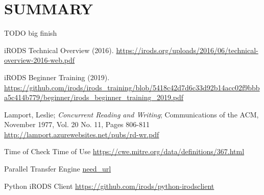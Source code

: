 \documentclass{irodsugm}
\begin{document}
\section*{SUMMARY}

TODO big finish

\begin{thebibliography}{5}

iRODS Technical Overview (2016). \url{https://irods.org/uploads/2016/06/technical-overview-2016-web.pdf}

iRODS Beginner Training (2019). \url{https://github.com/irods/irods_training/blob/5418c42d7d6c33d92b14acc02f9bbba5c414b779/beginner/irods_beginner_training_2019.pdf}

Lamport, Leslie; \textit{Concurrent Reading and Writing}; Communications of the ACM, November 1977, Vol. 20 No. 11, Pages 806-811 \url{http://lamport.azurewebsites.net/pubs/rd-wr.pdf}

Time of Check Time of Use \url{https://cwe.mitre.org/data/definitions/367.html}

Parallel Transfer Engine \url{need_url}

Python iRODS Client \url{https://github.com/irods/python-irodsclient}


\end{thebibliography}
\end{document}
